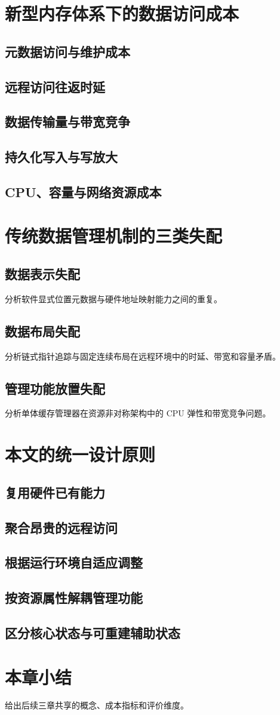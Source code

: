 \section{新型内存体系下的数据访问成本}
\subsection{元数据访问与维护成本}
\subsection{远程访问往返时延}
\subsection{数据传输量与带宽竞争}
\subsection{持久化写入与写放大}
\subsection{CPU、容量与网络资源成本}

\section{传统数据管理机制的三类失配}
\subsection{数据表示失配}
分析软件显式位置元数据与硬件地址映射能力之间的重复。
\subsection{数据布局失配}
分析链式指针追踪与固定连续布局在远程环境中的时延、带宽和容量矛盾。
\subsection{管理功能放置失配}
分析单体缓存管理器在资源非对称架构中的 CPU 弹性和带宽竞争问题。

\section{本文的统一设计原则}
\subsection{复用硬件已有能力}
\subsection{聚合昂贵的远程访问}
\subsection{根据运行环境自适应调整}
\subsection{按资源属性解耦管理功能}
\subsection{区分核心状态与可重建辅助状态}

\section{本章小结}
给出后续三章共享的概念、成本指标和评价维度。
